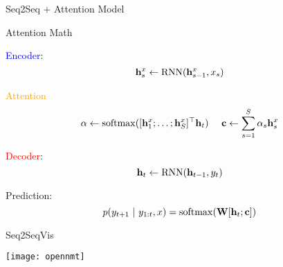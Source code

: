 \begin{frame}{Seq2Seq + Attention Model}
  \vspace{-0.25cm}

  \begin{center}
  \end{center}
\end{frame}

\begin{frame}{Attention Math}

  \textcolor{blue}{Encoder}:
  \[{\mathbf{h}^{x}_s \gets \operatorname*{RNN}(\mathbf{h}^{x}_{s-1}, x_s)} \]


  \textcolor{orange}{Attention}
  \[\alpha \gets  \operatorname*{softmax}(   [\mathbf{h}^{x}_1 ; \ldots; \mathbf{h}^{x}_S]^\top \mathbf{h}_{t} ) \ \ \ \
  {\mathbf{c}} \gets \sum_{s =1}^S \alpha_s \mathbf{h}_s^{x}  \]

  \textcolor{red}{Decoder}:
  \[{\mathbf{h}_t \gets \operatorname*{RNN}(\mathbf{h}_{t-1}, y_t)} \]

  Prediction:
  \[ p(y_{t+1}\  |\  y_{1:t}, x) = \operatorname*{softmax}( \mathbf{W} [\mathbf{h}_t; \mathbf{c}]) \]

\end{frame}

\begin{frame}{Seq2SeqVis}
  \vspace{-0.25cm}

  \begin{center}
  \end{center}

\end{frame}


\begin{frame}

  \begin{center}
    \texttt{[image: opennmt]}
  \end{center}

\end{frame}

